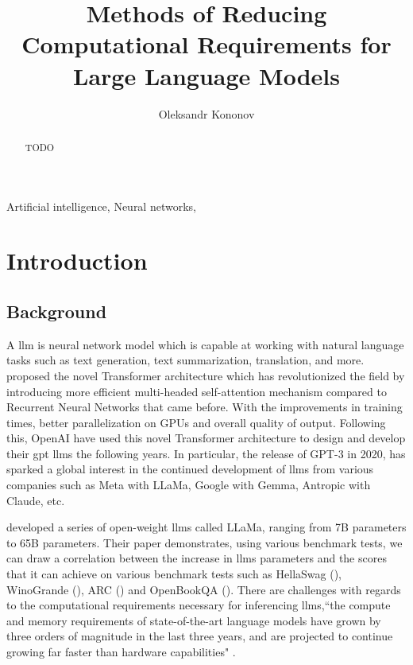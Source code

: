 \documentclass{ifacconf}
\begin{document}
	
	\begin{frontmatter}
		
		\title{Methods of Reducing Computational Requirements for Large Language Models} 
		
		\author[First]{Oleksandr Kononov} 
		
		\address[First]{South East Technological University, 
			Cork Road, Waterford, Ireland (e-mail: 20071032@mail.wit.ie).}
		
		\begin{abstract}                %
			TODO
		\end{abstract}
		
		\begin{keyword}
			Artificial intelligence, Neural networks, 
		\end{keyword}
		
	\end{frontmatter}
	\section{Introduction}
	\subsection{Background}
	A \gls{llm} is neural network model which is capable at working with natural language tasks such as text generation, text summarization, translation, and more. \cite{vaswani2017attentionneed} proposed the novel Transformer architecture which has revolutionized the field by introducing more efficient multi-headed self-attention mechanism compared to Recurrent Neural Networks that came before. With the improvements in training times, better parallelization on GPUs and overall quality of output.
	Following this, OpenAI have used this novel Transformer architecture to design and develop their \gls{gpt} \glspl{llm} the following years. In particular, the release of GPT-3 in 2020, has sparked a global interest in the continued development of \glspl{llm} from various companies such as Meta with LLaMa, Google with Gemma, Antropic with Claude, etc.
	
	\cite{touvron2023llamaopenefficientfoundation} developed a series of open-weight \glspl{llm} called LLaMa, ranging from 7B parameters to 65B parameters. Their paper demonstrates, using various benchmark tests, we can draw a correlation between the increase in \glspl{llm} parameters and the scores that it can achieve on various benchmark tests such as HellaSwag (\cite{zellers2019hellaswagmachinereallyfinish}), WinoGrande (\cite{sakaguchi2019winograndeadversarialwinogradschema}), ARC (\cite{clark2018thinksolvedquestionanswering}) and OpenBookQA (\cite{mihaylov2018suitarmorconductelectricity}). There are challenges with regards to the computational requirements necessary for inferencing \glspl{llm},``the compute and memory requirements of state-of-the-art language models have grown by three orders of magnitude in the last three years, and are projected to continue growing far faster than hardware capabilities" \cite[p.~97]{bommasani2022opportunitiesrisksfoundationmodels}.
	
\end{document}
